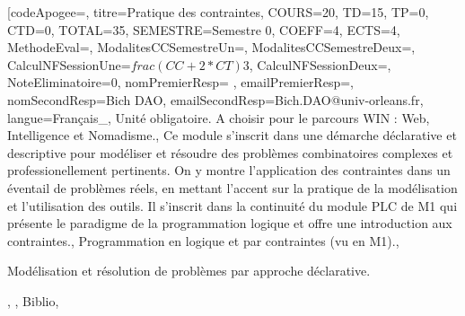 

\module[codeApogee={},
titre={Pratique des contraintes},
COURS={20},
TD={15},
TP={0},
CTD={0},
TOTAL={35},
SEMESTRE={Semestre 0},
COEFF={4},
ECTS={4},
MethodeEval={},
ModalitesCCSemestreUn={},
ModalitesCCSemestreDeux={},
CalculNFSessionUne={$frac{(CC+2*CT)}{3}$},
CalculNFSessionDeux={},
NoteEliminatoire={0},
nomPremierResp={ },
emailPremierResp={},
nomSecondResp={Bich DAO},
emailSecondResp={Bich.DAO@univ-orleans.fr},
langue={Français_},
{Unité obligatoire. A choisir pour le parcours WIN : Web, Intelligence et Nomadisme.},
{Ce module s'inscrit dans une démarche déclarative et descriptive pour modéliser et résoudre des problèmes combinatoires complexes et professionellement pertinents.
On y montre l'application des contraintes dans un éventail de problèmes réels, en mettant l'accent sur la pratique de la modélisation et l'utilisation des outils.
Il s'inscrit dans la continuité du module PLC de M1 qui présente le paradigme de la programmation logique et offre une introduction aux contraintes.},
{Programmation en logique et par contraintes (vu en M1).},
{\begin{itemize}
\ObjItem Modélisation et résolution de problèmes par approche déclarative.
\end{itemize}},
{},
{Biblio},

\vfill


